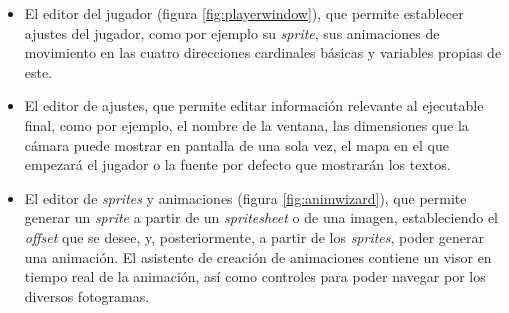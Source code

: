 \begin{itemize}
\begin{itemize}
		\item El editor del jugador (figura \ref{fig:playerwindow}), que permite establecer ajustes del jugador, como por ejemplo su \textit{sprite}, sus animaciones de movimiento en las cuatro direcciones cardinales básicas y variables propias de este.
		\item El editor de ajustes, que permite editar información relevante al ejecutable final, como por ejemplo, el nombre de la ventana, las dimensiones que la cámara puede mostrar en pantalla de una sola vez, el mapa en el que empezará el jugador o la fuente por defecto que mostrarán los textos.
		\item El editor de \textit{sprites} y animaciones (figura \ref{fig:animwizard}), que permite generar un \textit{sprite} a partir de un \textit{spritesheet} o de una imagen, estableciendo el \textit{offset} que se desee, y, posteriormente, a partir de los \textit{sprites}, poder generar una animación. El asistente de creación de animaciones contiene un visor en tiempo real de la animación, así como controles para poder navegar por los diversos fotogramas.
	\end{itemize}
\end{itemize}